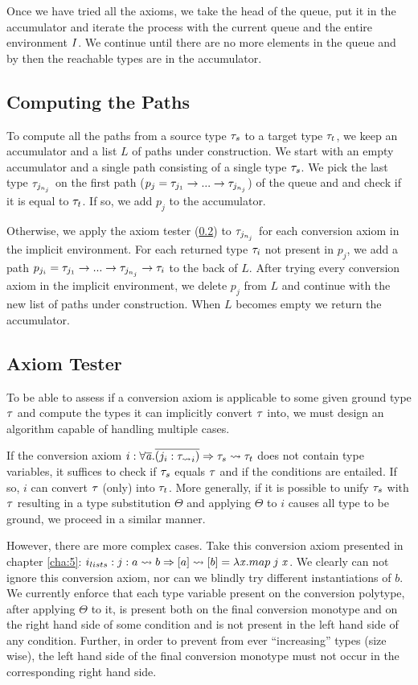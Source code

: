 Once we have tried all the axioms, we take the head of the queue, put it in the accumulator and iterate the process with the current queue and the entire environment $I$. We continue until there are no more elements in the queue and by then the reachable types are in the accumulator.

\subsection{Computing the Paths}
\label{paths}
To compute all the paths from a source type $\mathit{\tau}_s$ to a target type $\mathit{\tau}_t$, we keep an accumulator and a list $L$ of paths under construction. We start with an empty accumulator and a single path consisting of a single type $\mathit{\tau}_s$. We pick the last type $\mathit{\tau}_{j_{n_j}}$ on the first path ($p_j = \mathit{\tau}_{j_1}\to ... \to \mathit{\tau}_{j_{n_j}}$) of the queue and and check if it is equal to $\mathit{\tau}_t$. If so, we add $p_j$ to the accumulator.

Otherwise, we apply the axiom tester (\ref{onestep}) to $\mathit{\tau}_{j_{n_j}}$ for each conversion axiom in the implicit environment. For each returned type $\mathit{\tau}_i$ not present in $p_j$, we add a path $p_{j_i} = \mathit{\tau}_{j_1}\to ... \to \mathit{\tau}_{j_{n_j}} \to \mathit{\tau}_i$ to the back of $L$. After trying every conversion axiom in the implicit environment, we delete $p_j$ from $L$ and continue with the new list of paths under construction. When $L$ becomes empty we return the accumulator.

\subsection{Axiom Tester}
\label{onestep}
To be able to assess if a conversion axiom is applicable to some given ground type $\mathit{\tau}$ and compute the types it can implicitly convert $\mathit{\tau}$ into, we must design an algorithm capable of handling multiple cases.

 If the conversion axiom $i : \forall \overline {\mathit{a}} . \overline{(j_i : \mathit{\tau_{\rightsquigarrow}}_i)} \Rightarrow \mathit{\tau}_s \rightsquigarrow \mathit{\tau}_t$ does not contain type variables, it suffices to check if $\mathit{\tau}_s$ equals $\mathit{\tau}$ and if the conditions are entailed. If so, $i$ can convert $\mathit{\tau}$ (only) into $\mathit{\tau}_t$. More generally, if it is possible to unify $\mathit{\tau}_s$ with $\mathit{\tau}$ resulting in a type substitution $\Theta$ and applying $\Theta$ to $i$ causes all type to be ground, we proceed in a similar manner.

 However, there are more complex cases. Take this conversion axiom presented in chapter \ref{cha:5}: $i_{lists}: j: a \rightsquigarrow b \Rightarrow [a] \rightsquigarrow [b] = \lambda \mathit{x} . map\;j\;\mathit{x}$. We clearly can not ignore this conversion axiom, nor can we blindly try different instantiations of $b$. We currently enforce that each type variable present on the conversion polytype, after applying $\Theta$ to it, is present both on the final conversion monotype and on the right hand side of some condition and is not present in the left hand side of any condition. Further, in order to prevent from ever ``increasing'' types (size wise), the left hand side of the final conversion monotype must not occur in the corresponding right hand side.

